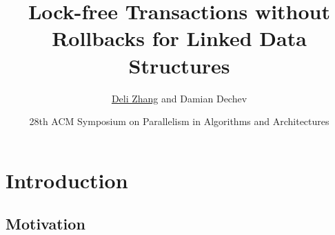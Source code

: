 \documentclass{beamer}
\begin{document}
\title[Lock-free Transactional Transformation]{Lock-free Transactions without Rollbacks for Linked Data Structures}
\author[D. Zhang and D. Dechev]{\underline{Deli Zhang} and Damian Dechev}

\date[SPAA 2016]{28th ACM Symposium on Parallelism in Algorithms and Architectures}

\begin{frame}
    \titlepage
\end{frame}


\section{Introduction}
\subsection{Motivation}
\end{document}
